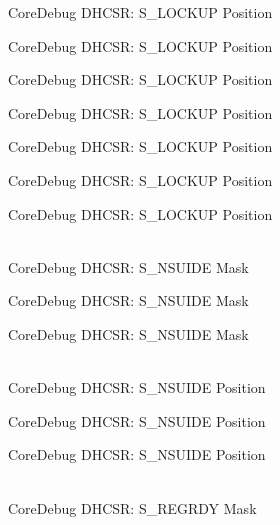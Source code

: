 \begin{DoxyRefList}
\label{deprecated__deprecated000113}%
%
Core\+Debug DHCSR:\+ S\+\_\+\+LOCKUP Position 

\label{deprecated__deprecated000167}%
%
Core\+Debug DHCSR:\+ S\+\_\+\+LOCKUP Position 

\label{deprecated__deprecated000252}%
%
Core\+Debug DHCSR:\+ S\+\_\+\+LOCKUP Position 

\label{deprecated__deprecated000309}%
%
Core\+Debug DHCSR:\+ S\+\_\+\+LOCKUP Position 

\label{deprecated__deprecated000385}%
%
Core\+Debug DHCSR:\+ S\+\_\+\+LOCKUP Position 

\label{deprecated__deprecated000472}%
%
Core\+Debug DHCSR:\+ S\+\_\+\+LOCKUP Position 

\label{deprecated__deprecated000574}%
%
Core\+Debug DHCSR:\+ S\+\_\+\+LOCKUP Position  
\item[{\parbox[t]{\linewidth}{Global \doxylink{group__CMSIS__SCB_gabe0164afd9f6b8800fb7e05280e0ecda}{Core\+Debug\+\_\+\+DHCSR\+\_\+\+S\+\_\+\+NSUIDE\+\_\+\+Msk} }}]\hfill \\
\label{deprecated__deprecated000018}%
%
Core\+Debug DHCSR:\+ S\+\_\+\+NSUIDE Mask 

\label{deprecated__deprecated000469}%
%
Core\+Debug DHCSR:\+ S\+\_\+\+NSUIDE Mask 

\label{deprecated__deprecated000571}%
%
Core\+Debug DHCSR:\+ S\+\_\+\+NSUIDE Mask  
\item[{\parbox[t]{\linewidth}{Global \doxylink{group__CMSIS__SCB_ga59e228c682eec72e892b2ce018afe477}{Core\+Debug\+\_\+\+DHCSR\+\_\+\+S\+\_\+\+NSUIDE\+\_\+\+Pos} }}]\hfill \\
\label{deprecated__deprecated000017}%
%
Core\+Debug DHCSR:\+ S\+\_\+\+NSUIDE Position 

\label{deprecated__deprecated000468}%
%
Core\+Debug DHCSR:\+ S\+\_\+\+NSUIDE Position 

\label{deprecated__deprecated000570}%
%
Core\+Debug DHCSR:\+ S\+\_\+\+NSUIDE Position  
\item[{\parbox[t]{\linewidth}{Global \doxylink{group__CMSIS__CoreDebug_gac4cd6f3178de48f473d8903e8c847c07}{Core\+Debug\+\_\+\+DHCSR\+\_\+\+S\+\_\+\+REGRDY\+\_\+\+Msk} }}]\hfill \\
\label{deprecated__deprecated000028}%
%
Core\+Debug DHCSR:\+ S\+\_\+\+REGRDY Mask 


\end{DoxyRefList}
